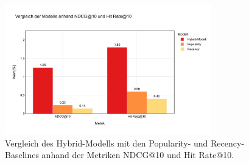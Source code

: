 
\begin{figure}[H]
    \centering
    \includegraphics[width=0.8\textwidth]{content/figures/svg/model_baseline_comparison.pdf}
    \caption{Vergleich des Hybrid-Modells mit den Popularity- und Recency-Baselines anhand der Metriken NDCG@10 und Hit Rate@10.}
    \label{fig:model_vergleich}
\end{figure}
